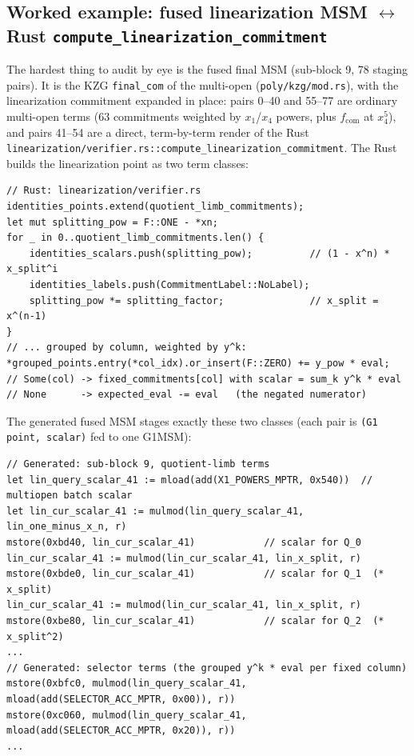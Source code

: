 \subsection{Worked example: fused linearization MSM \texorpdfstring{$\leftrightarrow$}{<->} Rust \texttt{compute\_\allowbreak{}linearization\_\allowbreak{}commitment}}
\label{sec:pr-fusedmsm}
\label{sec:pr-lin-msm}

The hardest thing to audit by eye is the fused final MSM (sub-block 9,
78 staging pairs). It is the KZG \texttt{final\_com} of the multi-open
(\texttt{poly/kzg/mod.rs}), with the linearization commitment expanded in
place: pairs 0--40 and 55--77 are ordinary multi-open terms (63
commitments weighted by $x_1$/$x_4$ powers, plus $f_\text{com}$ at
$x_4^5$), and pairs 41--54 are a direct, term-by-term render of the Rust
\texttt{linearization/\allowbreak{}verifier.rs::compute\_\allowbreak{}linearization\_\allowbreak{}commitment}.
The Rust builds the linearization point as two term classes:
\begin{lstlisting}[style=rust]
// Rust: linearization/verifier.rs
identities_points.extend(quotient_limb_commitments);
let mut splitting_pow = F::ONE - *xn;
for _ in 0..quotient_limb_commitments.len() {
    identities_scalars.push(splitting_pow);          // (1 - x^n) * x_split^i
    identities_labels.push(CommitmentLabel::NoLabel);
    splitting_pow *= splitting_factor;               // x_split = x^(n-1)
}
// ... grouped by column, weighted by y^k:
*grouped_points.entry(*col_idx).or_insert(F::ZERO) += y_pow * eval;
// Some(col) -> fixed_commitments[col] with scalar = sum_k y^k * eval
// None      -> expected_eval -= eval   (the negated numerator)
\end{lstlisting}

The generated fused MSM stages exactly these two classes (each pair is
\texttt{(G1 point, scalar)} fed to one G1MSM):
\begin{lstlisting}[style=yul]
// Generated: sub-block 9, quotient-limb terms
let lin_query_scalar_41 := mload(add(X1_POWERS_MPTR, 0x540))  // multiopen batch scalar
let lin_cur_scalar_41 := mulmod(lin_query_scalar_41, lin_one_minus_x_n, r)
mstore(0xbd40, lin_cur_scalar_41)            // scalar for Q_0
lin_cur_scalar_41 := mulmod(lin_cur_scalar_41, lin_x_split, r)
mstore(0xbde0, lin_cur_scalar_41)            // scalar for Q_1  (* x_split)
lin_cur_scalar_41 := mulmod(lin_cur_scalar_41, lin_x_split, r)
mstore(0xbe80, lin_cur_scalar_41)            // scalar for Q_2  (* x_split^2)
...
// Generated: selector terms (the grouped y^k * eval per fixed column)
mstore(0xbfc0, mulmod(lin_query_scalar_41, mload(add(SELECTOR_ACC_MPTR, 0x00)), r))
mstore(0xc060, mulmod(lin_query_scalar_41, mload(add(SELECTOR_ACC_MPTR, 0x20)), r))
...
\end{lstlisting}

